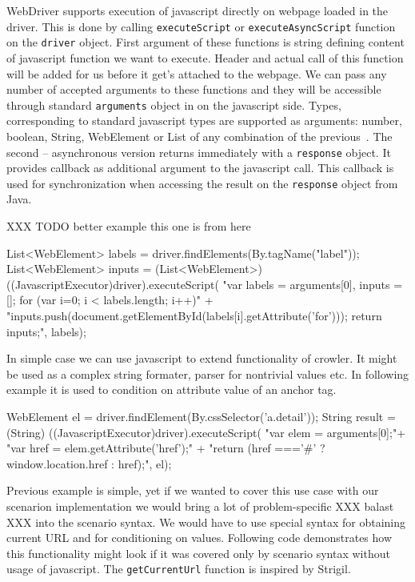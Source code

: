 WebDriver supports execution of javascript directly on webpage loaded in the
driver. This is done by calling {\tt executeScript} or {\tt executeAsyncScript}
function on the {\tt driver} object. First argument of these functions is
string defining content of javascript function we want to execute. Header and
actual call of this function will be added for us before it get's attached to
the webpage. We can pass any number of accepted arguments to these functions
and they will be accessible through standard {\tt arguments} object in on the
javascript side. Types, corresponding to standard javascript types are
supported as arguments: number, boolean, String, WebElement or List of any
combination of the previous~. The second -- asynchronous version returns
immediately with a {\tt response} object. It provides callback as additional
argument to the javascript call. This callback is used for synchronization when
accessing the result on the {\tt response} object from Java.  

XXX TODO better example this one is from
here~

\begtt
List<WebElement> labels = driver.findElements(By.tagName("label"));
List<WebElement> inputs = (List<WebElement>) ((JavascriptExecutor)driver).executeScript(
    "var labels = arguments[0], inputs = []; for (var i=0; i < labels.length; i++){" +
    "inputs.push(document.getElementById(labels[i].getAttribute('for'))); } return inputs;", labels);
\endtt

In simple case we can use javascript to extend functionality of crowler. It
might be used as a complex string formater, parser for nontrivial values etc. 
In following example it is used to condition on attribute value of an anchor
tag. 

\begtt
WebElement el = driver.findElement(By.cssSelector('a.detail'));
String result = (String) ((JavascriptExecutor)driver).executeScript(
"var elem = arguments[0];"+
"var href = elem.getAttribute('href');" +
"return (href ==='#' ? window.location.href : href);", el);
\endtt

Previous example is simple, yet if we wanted to cover this use case with our
scenarion implementation we would bring a lot of problem-specific XXX balast XXX
into the scenario syntax. We would have to use special syntax for obtaining
current URL and for conditioning on values. Following code demonstrates how this 
functionality might look if it was covered only by scenario syntax without usage
of javascript. The {\tt getCurrentUrl} function is inspired by Strigil. 

